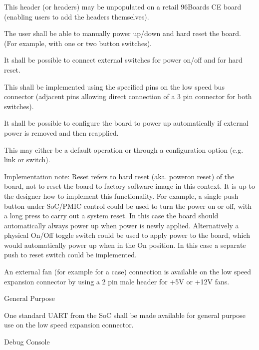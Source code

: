 \documentclass[a4paper,10pt,oneside,english]{sphinxmanual}
\begin{document}
\sphinxAtStartPar
This header (or headers) may be unpopulated on a retail 96Boards CE board (enabling users to add the headers themselves).

\sphinxAtStartPar
{}

\sphinxAtStartPar
The user shall be able to manually power up/down and hard reset the board.
(For example, with one or two button switches).

\sphinxAtStartPar
It shall be possible to connect external switches for power on/off and for hard reset.

\sphinxAtStartPar
This shall be implemented using the specified pins on the low speed bus connector (adjacent pins allowing direct connection of a 3 pin connector for both switches).

\sphinxAtStartPar
It shall be possible to configure the board to power up automatically if external power is removed and then re\sphinxhyphen{}applied.

\sphinxAtStartPar
This may either be a default operation or through a configuration option (e.g. link or switch).

\sphinxAtStartPar
Implementation note: Reset refers to hard reset (aka. power\sphinxhyphen{}on reset) of the board, not to reset the board to factory software image in this context. It is up to the designer how to implement this functionality. For example, a single push button under SoC/PMIC control could be used to turn the power on or off, with a long press to carry out a system reset. In this case the board should automatically always power up when power is newly applied. Alternatively a physical On/Off toggle switch could be used to apply power to the board, which would automatically power up when in the On position. In this case a separate push to reset switch could be implemented.

\sphinxAtStartPar
{}

\sphinxAtStartPar
An external fan (for example for a case) connection is available on the low speed expansion connector by using a 2 pin male header for +5V or +12V fans.

\sphinxAtStartPar
{}

\sphinxAtStartPar
General Purpose

\sphinxAtStartPar
One standard UART from the SoC shall be made available for general purpose use on the low speed expansion connector.

\sphinxAtStartPar
Debug Console
\end{document}
